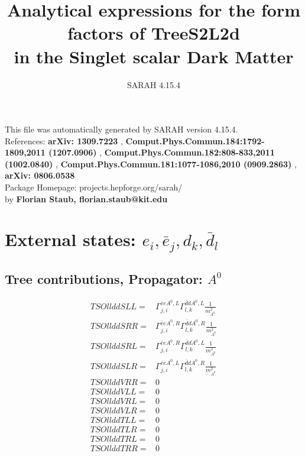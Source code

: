 \documentclass[A4,landscape]{article}
\begin{document}
\title{Analytical expressions for the form factors of TreeS2L2d\\ in the Singlet scalar Dark Matter } 
 \author{SARAH 4.15.4} 
 \maketitle 
 \vspace{10cm} 
This file was automatically generated by SARAH version 4.15.4.  \\ 
References: {\bf arXiv: 1309.7223 }, {\bf Comput.Phys.Commun.184:1792-1809,2011 (1207.0906) }, {\bf Comput.Phys.Commun.182:808-833,2011 (1002.0840) }, {\bf Comput.Phys.Commun.181:1077-1086,2010 (0909.2863) }, {\bf arXiv: 0806.0538 } \\ 
Package Homepage: projects.hepforge.org/sarah/ \\ 
by {\bf Florian Staub, florian.staub@kit.edu} 
 \pagebreak 
 \tableofcontents 
 \pagebreak 
\section{External states: ${e_{{i}}, \bar{e}_{{j}}, d_{{k}}, \bar{d}_{{l}}}$} 
\subsection{Tree contributions, Propagator: $A^0$} 

\begin{align} 
  TSOllddSLL= & \Gamma^{\bar{e}e A^0 ,L}_{j, i} \Gamma^{\bar{d}d A^0 ,L}_{l, k} \frac{1}{m^2_{A^0}} \\ 
  TSOllddSRR= & \Gamma^{\bar{e}e A^0 ,R}_{j, i} \Gamma^{\bar{d}d A^0 ,R}_{l, k} \frac{1}{m^2_{A^0}} \\ 
  TSOllddSRL= & \Gamma^{\bar{e}e A^0 ,R}_{j, i} \Gamma^{\bar{d}d A^0 ,L}_{l, k} \frac{1}{m^2_{A^0}} \\ 
  TSOllddSLR= & \Gamma^{\bar{e}e A^0 ,L}_{j, i} \Gamma^{\bar{d}d A^0 ,R}_{l, k} \frac{1}{m^2_{A^0}} \\ 
  TSOllddVRR= & 0 \\ 
  TSOllddVLL= & 0 \\ 
  TSOllddVRL= & 0 \\ 
  TSOllddVLR= & 0 \\ 
  TSOllddTLL= & 0 \\ 
  TSOllddTLR= & 0 \\ 
  TSOllddTRL= & 0 \\ 
  TSOllddTRR= & 0 \\ 
\end{align} 
\end{document}
